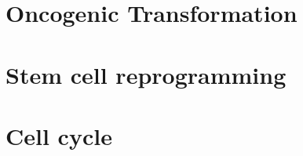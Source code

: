 \documentclass[11pt,a4paper]{report}      %
\begin{document}
\chapter{Oncogenic Transformation}
\label{cha:oncog-transf}


\chapter{Stem cell reprogramming}
\label{cha:stem-cells}
 

\chapter{Cell cycle}
\label{cha:cell-cycle}







\begin{appendices}
  
  
\end{appendices}




% 


\end{document}
